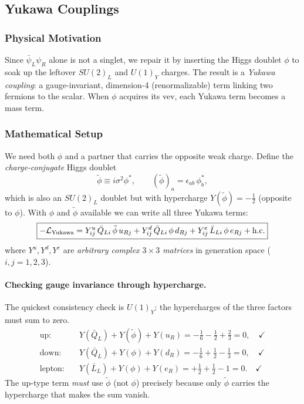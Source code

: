 \subsection{Yukawa Couplings}\label{subsec:lec20:yukawa}

\subsubsection*{Physical Motivation}

Since $\bar\psi_L\psi_R$ alone is not a singlet, we repair it by
inserting the Higgs doublet $\phi$ to soak up the leftover $SU(2)_L$
and $U(1)_Y$ charges. The result is a \emph{Yukawa coupling}: a
gauge-invariant, dimension-4 (renormalizable) term linking two
fermions to the scalar. When $\phi$ acquires its vev, each Yukawa term
becomes a mass term.

\subsubsection*{Mathematical Setup}

We need both $\phi$ and a partner that carries the opposite weak
charge. Define the \emph{charge-conjugate} Higgs doublet
\begin{equation}
  \tilde\phi \equiv i\sigma^2\phi^* ,
  \qquad (\tilde\phi)_a = \epsilon_{ab}\,\phi_b^* ,
  \label{eq:lec20:phitilde}
\end{equation}
which is also an $SU(2)_L$ doublet but with hypercharge $Y(\tilde\phi)
= -\tfrac12$ (opposite to $\phi$). With $\phi$ and $\tilde\phi$
available we can write all three Yukawa terms:
\begin{equation}
  \boxed{
    -\mathcal{L}_{\rm Yukawa}
    = Y^u_{ij}\,\bar Q_{Li}\,\tilde\phi\,u_{Rj}
    + Y^d_{ij}\,\bar Q_{Li}\,\phi\,d_{Rj}
    + Y^e_{ij}\,\bar L_{Li}\,\phi\,e_{Rj}
    + \text{h.c.}
  }
  \label{eq:lec20:yukawa}
\end{equation}
where $Y^u, Y^d, Y^e$ are \emph{arbitrary complex $3\times3$ matrices}
in generation space ($i,j=1,2,3$).

\paragraph{Checking gauge invariance through hypercharge.}
The quickest consistency check is $U(1)_Y$: the hypercharges of the
three factors must sum to zero.
\begin{align*}
  \text{up:}   \quad & Y(\bar Q_L) + Y(\tilde\phi) + Y(u_R)
                       = -\tfrac16 - \tfrac12 + \tfrac23 = 0,\quad\checkmark\\
  \text{down:} \quad & Y(\bar Q_L) + Y(\phi) + Y(d_R)
                       = -\tfrac16 + \tfrac12 - \tfrac13 = 0,\quad\checkmark\\
  \text{lepton:}\quad& Y(\bar L_L) + Y(\phi) + Y(e_R)
                       = +\tfrac12 + \tfrac12 - 1 = 0.\quad\checkmark
\end{align*}
The up-type term \emph{must} use $\tilde\phi$ (not $\phi$) precisely
because only $\tilde\phi$ carries the hypercharge that makes the sum
vanish.

